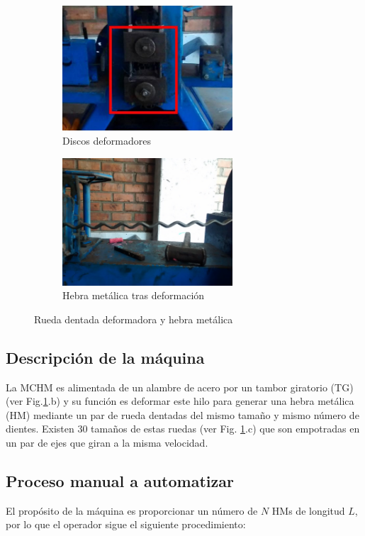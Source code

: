 \documentclass[main_conf.tex]{subfiles}
\begin{document}
\begin{figure}[t]
  \centering
  \begin{subfigure}[b]{0.5\textwidth}
    \centering
    \includegraphics[width=2.5in]{../img/maquina/deformadores.jpg}
    \caption{Discos deformadores}
  \end{subfigure}

  \begin{subfigure}[b]{0.5\textwidth}
    \centering
    \includegraphics[width=2.5in]{../img/maquina/hebra.jpg}
    \caption{Hebra metálica tras deformación}
  \end{subfigure}

  \caption{Rueda dentada deformadora y hebra metálica}
  \label{maquina_a_automatizar}
\end{figure}


\subsection{Descripción de la máquina}
La MCHM es alimentada de un alambre de acero por un tambor
giratorio (TG) (ver Fig.\ref{maquina_a_automatizar}.b) y su función es
deformar este hilo para generar una hebra metálica (HM) mediante un
par de rueda dentadas del mismo tamaño y mismo número de dientes.
Existen 30 tamaños de estas ruedas (ver Fig.
\ref{maquina_a_automatizar}.c) que son empotradas en un par
de ejes que giran a la misma velocidad.

\subsection{Proceso manual a automatizar}
\label{sec:intro:proceso_manual}
El propósito de la máquina es proporcionar un número de $N$ HMs
de longitud $L$, por lo que el operador sigue el siguiente
procedimiento:
\end{document}
